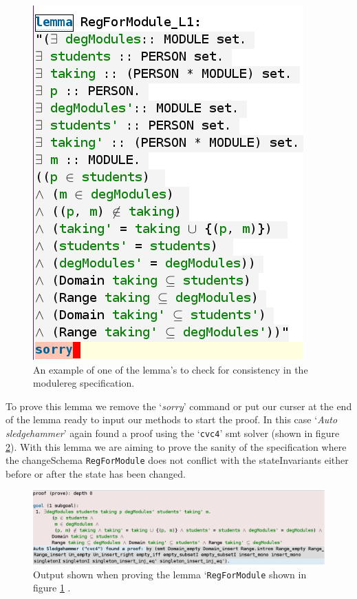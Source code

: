 \begin{figure}[H]
\centering
\includegraphics[scale=0.5]{Figures/Evaluation/lemmaformodulereg.png}
\caption{An example of one of the lemma's to check for consistency in the modulereg specification. \label{fig:modulereglemma1}}
\end{figure}

To prove this lemma we remove the `\emph{sorry}' command or put our curser at the end of the lemma ready to input our methods to start the proof. In this case `\emph{Auto sledgehammer}' again found a proof using the `\texttt{cvc4}' \gls{smt} solver (shown in figure \ref{fig:autosolvermodulereg}). With this lemma we are aiming to prove the sanity of the specification where the changeSchema \verb|RegForModule| does not conflict with the stateInvariants either before or after the state has been changed.

\begin{figure}[H]
\centering
\includegraphics[scale=0.35]{Figures/Evaluation/moduleregproof.png}
\caption{Output shown when proving the lemma `\texttt{RegForModule} shown in figure \ref{fig:modulereglemma1} . \label{fig:autosolvermodulereg}}
\end{figure}

